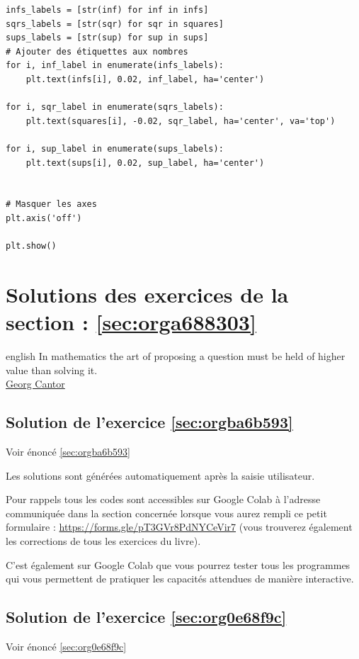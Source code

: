 \documentclass[a4paper, 11pt, twoside]{book}
\begin{document}
\begin{verbatim}
infs_labels = [str(inf) for inf in infs]
sqrs_labels = [str(sqr) for sqr in squares]
sups_labels = [str(sup) for sup in sups]
# Ajouter des étiquettes aux nombres
for i, inf_label in enumerate(infs_labels):
    plt.text(infs[i], 0.02, inf_label, ha='center')

for i, sqr_label in enumerate(sqrs_labels):
    plt.text(squares[i], -0.02, sqr_label, ha='center', va='top')

for i, sup_label in enumerate(sups_labels):
    plt.text(sups[i], 0.02, sup_label, ha='center')


# Masquer les axes
plt.axis('off')

plt.show()
\end{verbatim}
\stopcontents[level-2]

\chapter{Solutions des exercices de la section : \ref{sec:orga688303}}
\label{sec:org632b46d}
\startcontents[level-2]

\begin{foreigndisplayquote}{english}
In mathematics the art of proposing a question must be held of
higher value than solving it.\\

\href{https://en.wikipedia.org/wiki/Georg\_Cantor}{Georg Cantor}
\end{foreigndisplayquote}

\section{Solution de l'exercice \ref{sec:orgba6b593}}
\label{sec:org3cfb91a}
Voir énoncé \ref{sec:orgba6b593}

Les solutions sont générées automatiquement après la saisie
utilisateur.

Pour rappels tous les codes sont accessibles sur Google Colab à
l'adresse communiquée dans la section concernée lorsque vous
aurez rempli ce petit formulaire :
\url{https://forms.gle/pT3GVr8PdNYCeVir7} (vous trouverez également
les corrections de tous les exercices du livre).

C'est également sur Google Colab que vous pourrez tester tous les
programmes qui vous permettent de pratiquer les capacités attendues
de manière interactive.

\section{Solution de l'exercice \ref{sec:org0e68f9c}}
\label{sec:org7cc2be4}
Voir énoncé \ref{sec:org0e68f9c}
\end{document}
